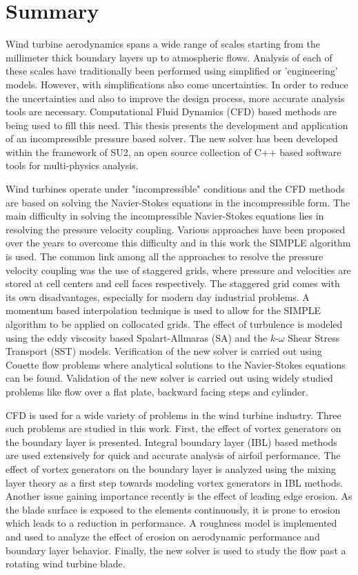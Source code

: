 \chapter*{Summary}

Wind turbine aerodynamics spans a wide range of scales starting from the millimeter thick boundary layers up to atmospheric flows. Analysis of each of these scales have traditionally been performed using simplified or 'engineering' models. However, with simplifications also come uncertainties. In order to reduce the uncertainties and also to improve the design process, more accurate analysis tools are necessary. Computational Fluid Dynamics (CFD) based methods are being used to fill this need. This thesis presents the development and application of an incompressible pressure based solver. The new solver has been developed within the framework of SU2, an open source collection of C++ based software tools for multi-physics analysis. 

Wind turbines operate under "incompressible" conditions and the CFD methods are based on solving the Navier-Stokes equations in the incompressible form. The main difficulty in solving the incompressible Navier-Stokes equations lies in resolving the pressure velocity coupling. Various approaches have been proposed over the years to overcome this difficulty and in this work the SIMPLE algorithm is used. The common link among all the approaches to resolve the pressure velocity coupling was the use of staggered grids, where pressure and velocities are stored at cell centers and cell faces respectively. The staggered grid comes with its own disadvantages, especially for modern day industrial problems. A momentum based interpolation technique is used to allow for the SIMPLE algorithm to be applied on collocated grids. The effect of turbulence is modeled using the eddy viscosity based Spalart-Allmaras (SA) and the $k$-$\omega$ Shear Stress Transport (SST) models. Verification of the new solver is carried out using Couette flow problems where analytical solutions to the Navier-Stokes equations can be found. Validation of the new solver is carried out using widely studied problems like flow over a flat plate, backward facing steps and cylinder. 

CFD is used for a wide variety of problems in the wind turbine industry. Three such problems are studied in this work. First, the effect of vortex generators on the boundary layer is presented. Integral boundary layer (IBL) based methods are used extensively for quick and accurate analysis of airfoil performance. The effect of vortex generators on the boundary layer is analyzed using the mixing layer theory as a first step towards modeling vortex generators in IBL methods. Another issue gaining importance recently is the effect of leading edge erosion. As the blade surface is exposed to the elements continuously, it is prone to erosion which leads to a reduction in performance. A roughness model is implemented and used to analyze the effect of erosion on aerodynamic performance and boundary layer behavior. Finally, the new solver is used to study the flow past a rotating wind turbine blade.

